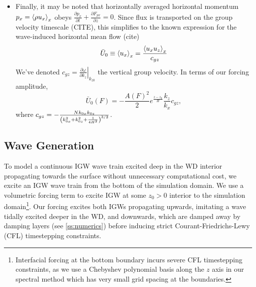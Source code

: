 \documentclass[twocolumn,
        nofootinbib,
        usenames, %
        dvipsnames %
    ]{revtex4-1}%
\newcommand*{\pd}[2]{\frac{\partial#1}{\partial#2}}
\newcommand*{\at}[1]{\left.#1\right|}
\DeclarePairedDelimiter\ev{\langle}{\rangle}
\DeclarePairedDelimiter\p{\lparen}{\rparen}
\begin{document}
\begin{itemize}
    \item Finally, it may be noted that horizontally averaged horizontal
        momentum $p_x = \ev*{\rho u_x}_x$ obeys $\pd{p_x}{t} + \pd{F_{px}}{z} =
        0$. Since flux is transported on the group velocity timescale (CITE),
        this simplifies to the known expression for the wave-induced horizontal
        mean flow (cite)
        \begin{equation}
            \bar{U}_0 \equiv \ev*{u_x}_x = \frac{\ev*{u_xu_z}_x}{c_{gz}}
        \end{equation}
        We've denoted $c_{gz} = \at{\pd{\omega}{k_{z}}}_{k_{z0}}$ the vertical group
        velocity. In terms of our forcing amplitude,
        \begin{equation}
            \bar{U}_0(F) = -\frac{A(F)^2}{2}e^{\frac{z - z_0}{H}} \frac{k_z}{k_x}c_{gz},
                \label{eq:u0_lin}
        \end{equation}
        where $c_{gz} = -\frac{Nk_{0x}k_{0z}}{\p*{k_{0x}^2 + k_{0z}^2 +
        \frac{1}{4H^2}}^{3/2}}$.
\end{itemize}
%

\subsection{Wave Generation}

To model a continuous IGW wave train excited deep in the WD interior propagating
towards the surface without unnecessary computational cost, we excite an
IGW wave train from the bottom of the simulation domain. We use a volumetric
forcing term to excite IGW at some $z_0 > 0$ interior to the simulation
domain\footnote{Interfacial forcing at the bottom boundary incurs severe CFL
timestepping constraints, as we use a Chebyshev polynomial basis along the $z$
axis in our spectral method which has very small grid spacing at the
boundaries.}. Our forcing excites both IGWs propagating upwards, imitating a
wave tidally excited deeper in the WD, and downwards, which are damped away by
damping layers (see \autoref{ss:numerics}) before inducing strict
Courant-Friedrichs-Lewy (CFL) timestepping constraints.
\end{document}

